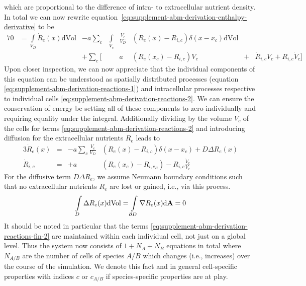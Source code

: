 which are proportional to the difference of intra- to extracellular nutrient density.
In total we can now rewrite equation~\ref{eq:supplement-abm-derivation-enthalpy-derivative} to be
\begin{alignat}{7}
    0 &=
    \int\limits_{V_D}\dot{R}_e(x)\text{dVol}
    &-a\sum\limits_{c}&\int\limits_{V_{c}}&\frac{V_{c}}{V_D}&(R_e(x)-R_{i,c})\delta(x-x_{c})\text{dVol}&&
    \label{eq:supplement-abm-derivation-reactions-1}\\
    &&+ \sum\limits_{c}\Big[& &a&(R_e(x_{c})-R_{i,c}) V_{c} &+& \dot{R}_{i,c}V_{c} +
    R_{i,c}\dot{V}_{c}\Big]
    \label{eq:supplement-abm-derivation-reactions-2}
\end{alignat}
Upon closer inspection, we can now appreciate that the individual components of this
equation can be understood as spatially distributed processes (equation
\ref{eq:supplement-abm-derivation-reactions-1}) and intracellular processes respective to
individual cells \ref{eq:supplement-abm-derivation-reactions-2}.
We can ensure the conservation of energy be setting all of these components to zero
individually and requiring equality under the integral.
Additionally dividing by the volume $V_c$ of the cells for terms
\ref{eq:supplement-abm-derivation-reactions-2} and introducing diffusion for the
extracellular nutrients $R_e$ leads to
\begin{alignat}{3}
    \dot{R}_e(x) &=&-a\sum\limits_{c}\frac{V_{c}}{V_D}&(R_e(x)-R_{i,c})\delta(x-x_{c}) +
    D\Delta R_e(x)\\
    \dot{R}_{i,c} &= &+ a &(R_e(x_{c}) - R_{i,c_B}) -R_{i,c}\frac{\dot{V}_{c}}{V_{c}}
    \label{eq:supplement-abm-derivation-reactions-fin-2}
\end{alignat}
For the diffusive term $D\Delta R_e$, we assume Neumann boundary conditions such that no
extracellular nutrients $R_e$ are lost or gained, i.e., via this process.
\begin{equation}
    \int\limits_D \Delta R_e(x) \text{dVol} = \int\limits_{\partial D} \nabla
    R_e(x)\text{d\textbf{A}}= 0
\end{equation}
It should be noted in particular that the terms
\ref{eq:supplement-abm-derivation-reactions-fin-2} are maintained within each individual
cell, not just on a global level.
Thus the system now consists of $1+N_A+N_B$ equations in total where $N_{A/B}$ are the
number of cells of species $A/B$ which changes (i.e., increases) over the course of the simulation.
We denote this fact and in general cell-specific properties with indices $c$ or $c_{A/B}$
if species-specific properties are at play.
